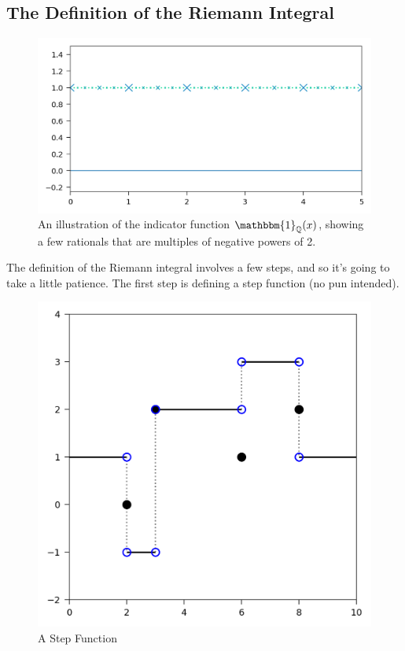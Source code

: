 \subsection{The Definition of the Riemann Integral}
\begin{figure}[ht]
	\centering
	\includegraphics{Code/Rational.png}
	\caption{An illustration of the indicator function $\mathbbm{1}_\Q(x)$, showing a few rationals that are multiples of negative powers of 2.}
	\label{fig:rational}
\end{figure}

The definition of the Riemann integral involves a few steps, and so it's going to take a little patience. The first step is defining a step function (no pun intended).
%
\begin{figure}[h]
	\centering
	\includegraphics{Code/Step.png}
	\caption{A Step Function}
	\label{fig:step}
\end{figure}

